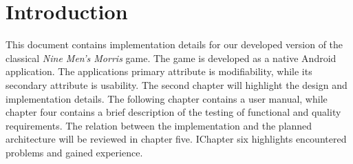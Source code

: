 \section{Introduction}

This document contains implementation details for our developed version of the classical \emph{Nine Men's Morris} game. The game is developed as a native Android application. The applications primary attribute is modifiability, while its secondary attribute is usability. The second chapter will highlight the design and implementation details. The following chapter contains a user manual, while chapter four contains a brief description of the testing of functional and quality requirements. The relation between the implementation and the planned architecture will be reviewed in chapter five. IChapter six highlights encountered problems and gained experience.




